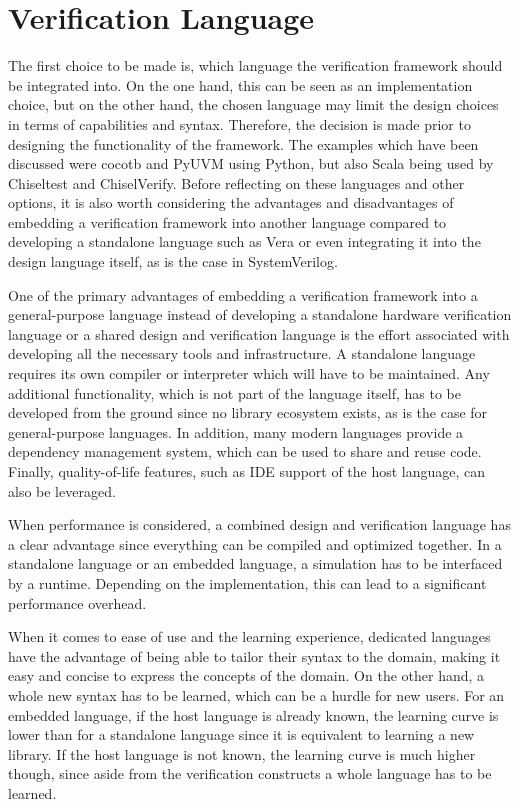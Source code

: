 \section{Verification Language} %

The first choice to be made is, which language the verification framework should be integrated into. On the one hand,
this can be seen as an implementation choice, but on the other hand, the chosen language may limit the design choices
in terms of capabilities and syntax. Therefore, the decision is made prior to designing the functionality of the
framework. The examples
which have been discussed were cocotb and PyUVM using Python, but also Scala being used by Chiseltest and
ChiselVerify. Before reflecting on these languages and other options, it is also worth considering the advantages
and disadvantages of embedding a verification framework into another language compared to developing a standalone
language such as Vera or even integrating it into the design language itself, as is the case in SystemVerilog.

One of the primary advantages of embedding a verification framework into a general-purpose language instead of
developing a standalone hardware verification language or a shared design and verification language is the effort
associated with developing all the necessary tools and infrastructure. A standalone language requires its own
compiler or interpreter which will have to be maintained. Any additional functionality, which is not part of the
language itself, has to be developed from the ground since no library ecosystem exists, as is the case for
general-purpose languages. In addition, many modern languages provide a dependency management system, which can be
used to share and reuse code. Finally, quality-of-life features, such as IDE support of the host language, can
also be leveraged.

When performance is considered, a combined design and verification language has a clear advantage since everything
can be compiled and optimized together. In a standalone language or an embedded language, a simulation has to be
interfaced by a runtime. Depending on the implementation, this can lead to a significant performance overhead.

When it comes to ease of use and the learning experience, dedicated languages have the advantage of being able to
tailor their syntax to the domain, making it easy and concise to express the concepts of the domain. On the other
hand, a whole new syntax has to be learned, which can be a hurdle for new users. For an embedded language, if the
host language is already known, the learning curve is lower than for a standalone language since it is equivalent to
learning a new library. If the host language is not known, the learning curve is much higher though, since aside from
the verification constructs a whole language has to be learned.

